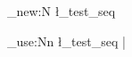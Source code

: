 \ExplSyntaxOn
\seq_new:N \l_test_seq
\def\prefix{l_test}

\seq_use:Nn \l_test_seq {|}
\ExplSyntaxOff
